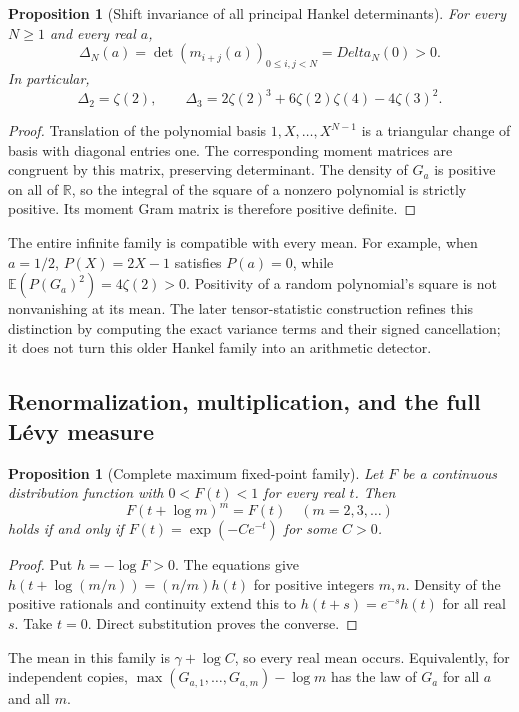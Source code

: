 \documentclass[11pt,a4paper]{article}
\newcommand{\R}{\mathbb R}
\newtheorem{proposition}[theorem]{Proposition}
\theoremstyle{definition}
\theoremstyle{remark}
\numberwithin{equation}{section}
\begin{document}
\begin{proposition}[Shift invariance of all principal Hankel determinants]
\label{wr:prop-hankel-shift}
For every \(N\ge1\) and every real \(a\),
\[
 \Delta_N(a)=\det(m_{i+j}(a))_{0\le i,j<N}=Delta_N(0)>0.
\]
In particular,
\[
 \Delta_2=\zeta(2),\qquad
 \Delta_3=2\zeta(2)^3+6\zeta(2)\zeta(4)-4\zeta(3)^2.
\]
\end{proposition}
\begin{proof}
Translation of the polynomial basis \(1,X,\ldots,X^{N-1}\) is a
triangular change of basis with diagonal entries one. The corresponding
moment matrices are congruent by this matrix, preserving determinant.
The density of \(G_a\) is positive on all of \(\R\), so the integral
of the square of a nonzero polynomial is strictly positive. Its moment
Gram matrix is therefore positive definite.
\end{proof}

The entire infinite family is compatible with every mean. For example,
when \(a=1/2\), \(P(X)=2X-1\) satisfies \(P(a)=0\), while
\(\mathbb E(P(G_a)^2)=4\zeta(2)>0\). Positivity of a random polynomial's
square is not nonvanishing at its mean. The later tensor-statistic
construction refines this distinction by computing the exact variance
terms and their signed cancellation; it does not turn this older
Hankel family into an arithmetic detector.

\subsection{Renormalization, multiplication, and the full L\'evy measure}

\begin{proposition}[Complete maximum fixed-point family]\label{wr:prop-max-fixed}
Let \(F\) be a continuous distribution function with
\(0<F(t)<1\) for every real \(t\). Then
\[
 F(t+\log m)^m=F(t)\quad(m=2,3,\ldots)
\]
holds if and only if \(F(t)=\exp(-C e^{-t})\) for some \(C>0\).
\end{proposition}
\begin{proof}
Put \(h=-\log F>0\). The equations give
\(h(t+\log(m/n))=(n/m)h(t)\) for positive integers \(m,n\).
Density of the positive rationals and continuity extend this to
\(h(t+s)=e^{-s}h(t)\) for all real \(s\). Take \(t=0\).
Direct substitution proves the converse.
\end{proof}
The mean in this family is \(\gamma+\log C\), so every real mean
occurs. Equivalently, for independent copies,
\(\max(G_{a,1},\ldots,G_{a,m})-\log m\) has the law of \(G_a\) for
all \(a\) and all \(m\).
\end{document}
